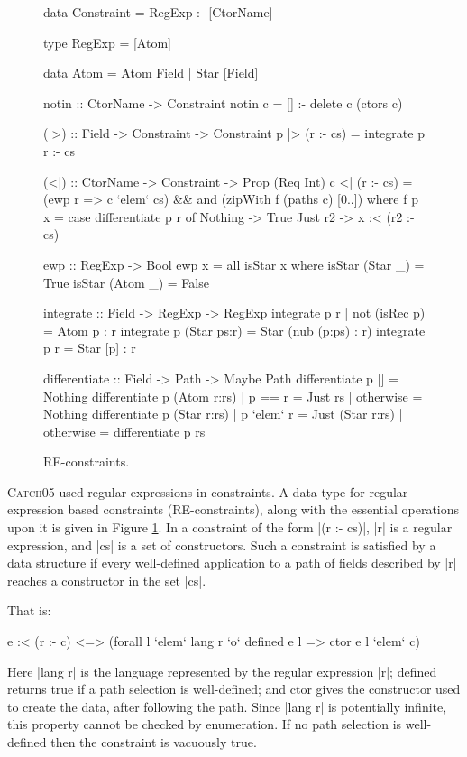\documentclass[preprint]{sigplanconf}
\newcommand{\C}[1]{\textsf{#1}}
\newcommand{\catch}{\textsc{Catch}}
\begin{document}
\begin{figure}
\begin{code}
data Constraint = RegExp :- [CtorName]

type RegExp = [Atom]

data Atom  =  Atom  Field
           |  Star  [Field]

notin :: CtorName -> Constraint
notin c = [] :- delete c (ctors c)

(|>) :: Field -> Constraint -> Constraint
p |> (r :- cs) = integrate p r :- cs

(<|) :: CtorName -> Constraint -> Prop (Req Int)
c <| (r :- cs) = (ewp r => c `elem` cs) &&
    and (zipWith f (paths c) [0..])
    where
    f p x = case  differentiate p r of
                  Nothing -> True
                  Just r2 -> x :< (r2 :- cs)

ewp :: RegExp -> Bool
ewp x = all isStar x
   where  isStar (Star  _) = True
          isStar (Atom  _) = False

integrate :: Field -> RegExp -> RegExp
integrate p r | not (isRec p) = Atom p : r
integrate p (Star ps:r) = Star (nub (p:ps) : r)
integrate p r = Star [p] : r

differentiate :: Field -> Path -> Maybe Path
differentiate p [] = Nothing
differentiate p (Atom  r:rs)  | p == r     = Just rs
                              | otherwise  = Nothing
differentiate p (Star  r:rs)  | p `elem` r  = Just (Star r:rs)
                              | otherwise   = differentiate p rs
\end{code}
\caption{RE-constraints.}
\label{fig:regexp}
\end{figure}

\catch05 used regular expressions in constraints. A data type for regular expression based constraints (RE-constraints), along with the essential operations upon it is given in Figure \ref{fig:regexp}. In a constraint of the form |(r :- cs)|, |r| is a regular expression, and |cs| is a set of constructors. Such a constraint is satisfied by a data structure if every well-defined application to a path of fields described by |r| reaches a constructor in the set |cs|.

That is:

\begin{code}
e :< (r :- c) <=> (forall l `elem` lang r `o` defined e l => ctor e l `elem` c)
\end{code}

Here |lang r| is the language represented by the regular expression |r|; \C{defined} returns true if a path selection is well-defined; and \C{ctor} gives the constructor used to create the data, after following the path. Since |lang r| is potentially infinite, this property cannot be checked by enumeration. If no path selection is well-defined then the constraint is vacuously true.
\end{document}
